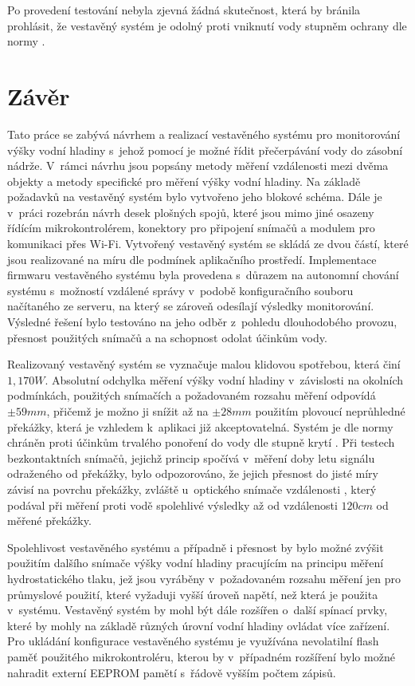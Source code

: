             Po provedení testování nebyla zjevná žádná skutečnost, která by bránila prohlásit, že vestavěný systém je odolný proti vniknutí vody stupněm ochrany  dle normy .

\chapter{Závěr}
    Tato práce se zabývá návrhem a realizací vestavěného systému pro monitorování výšky vodní hladiny s~jehož pomocí je možné řídit přečerpávání vody do zásobní nádrže. V~rámci návrhu jsou popsány metody měření vzdálenosti mezi dvěma objekty a metody specifické pro měření výšky vodní hladiny. Na základě požadavků na vestavěný systém bylo vytvořeno jeho blokové schéma. Dále je v~práci rozebrán návrh desek plošných spojů, které jsou mimo jiné osazeny řídícím mikrokontrolérem, konektory pro připojení snímačů a modulem pro komunikaci přes Wi-Fi. Vytvořený vestavěný systém se skládá ze dvou částí, které jsou realizované na míru dle podmínek aplikačního prostředí. Implementace firmwaru vestavěného systému byla provedena s~důrazem na autonomní chování systému s~možností vzdálené správy v~podobě konfiguračního souboru načítaného ze serveru, na který se zároveň odesílají výsledky monitorování. Výsledné řešení bylo testováno na jeho odběr z~pohledu dlouhodobého provozu, přesnost použitých snímačů a na schopnost odolat účinkům vody.

    Realizovaný vestavěný systém se vyznačuje malou klidovou spotřebou, která činí $1,170\unit{W}$. Absolutní odchylka měření výšky vodní hladiny v~závislosti na okolních podmínkách, použitých snímačích a požadovaném rozsahu měření odpovídá $\pm59\unit{mm}$, přičemž je možno ji snížit až na $\pm28\unit{mm}$ použitím plovoucí neprůhledné překážky, která je vzhledem k~aplikaci již akceptovatelná. Systém je dle normy  chráněn proti účinkům trvalého ponoření do vody dle stupně krytí .
    Při testech bezkontaktních snímačů, jejichž princip spočívá v~měření doby letu signálu odraženého od překážky, bylo odpozorováno, že jejich přesnost do jisté míry závisí na povrchu překážky, zvláště u~optického snímače vzdálenosti , který podával při měření proti vodě spolehlivé výsledky až od vzdálenosti $120\unit{cm}$ od měřené překážky.

    Spolehlivost vestavěného systému a případně i přesnost by bylo možné zvýšit použitím dalšího snímače výšky vodní hladiny pracujícím na principu měření hydrostatického tlaku, jež jsou vyráběny v~požadovaném rozsahu měření jen pro průmyslové použití, které vyžaduji vyšší úroveň napětí, než která je použita v~systému. Vestavěný systém by mohl být dále rozšířen o~další spínací prvky, které by mohly na základě různých úrovní vodní hladiny ovládat více zařízení. Pro ukládání konfigurace vestavěného systému je využívána nevolatilní flash paměť použitého mikrokontroléru, kterou by v~případném rozšíření bylo možné nahradit externí EEPROM pamětí s~řádově vyšším počtem zápisů.